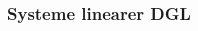 \documentclass[6pt]{article}
\begin{document}
\begin{multicols*}{3}
	\subsubsection*{Systeme linearer DGL}
%		
%		
%		
%	
%	
%		
%	
	

\end{multicols*}
\end{document}
